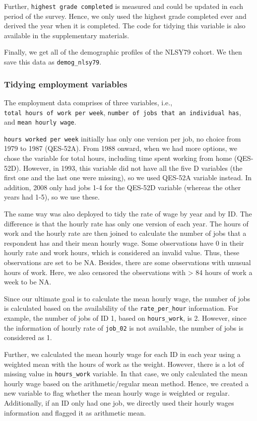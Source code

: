 \documentclass[12pt]{article}
\begin{document}
Further, \texttt{highest\ grade\ completed} is measured and could be updated in each period of the survey. Hence, we only used the highest grade completed ever and derived the year when it is completed. The code for tidying this variable is also available in the supplementary materials.

Finally, we get all of the demographic profiles of the NLSY79 cohort. We then save this data as \texttt{demog\_nlsy79}.

\hypertarget{tidyemp}{%
\subsubsection{Tidying employment variables}\label{tidyemp}}

The employment data comprises of three variables, i.e., \texttt{total\ hours\ of\ work\ per\ week}, \texttt{number\ of\ jobs\ that\ an\ individual\ has}, and \texttt{mean\ hourly\ wage}.

\texttt{hours\ worked\ per\ week} initially has only one version per job, no choice from 1979 to 1987 (QES-52A). From 1988 onward, when we had more options, we chose the variable for total hours, including time spent working from home (QES-52D). However, in 1993, this variable did not have all the five D variables (the first one and the last one were missing), so we used QES-52A variable instead. In addition, 2008 only had jobs 1-4 for the QES-52D variable (whereas the other years had 1-5), so we use these.

The same way was also deployed to tidy the rate of wage by year and by ID. The difference is that the hourly rate has only one version of each year. The hours of work and the hourly rate are then joined to calculate the number of jobs that a respondent has and their mean hourly wage. Some observations have 0 in their hourly rate and work hours, which is considered an invalid value. Thus, these observations are set to be NA. Besides, there are some observations with unusual hours of work. Here, we also censored the observations with \textgreater{} 84 hours of work a week to be NA.

Since our ultimate goal is to calculate the mean hourly wage, the number of jobs is calculated based on the availability of the \texttt{rate\_per\_hour} information. For example, the number of jobs of ID 1, based on \texttt{hours\_work}, is 2. However, since the information of hourly rate of \texttt{job\_02} is not available, the number of jobs is considered as 1.

Further, we calculated the mean hourly wage for each ID in each year using a weighted mean with the hours of work as the weight. However, there is a lot of missing value in \texttt{hours\_work} variable. In that case, we only calculated the mean hourly wage based on the arithmetic/regular mean method. Hence, we created a new variable to flag whether the mean hourly wage is weighted or regular. Additionally, if an ID only had one job, we directly used their hourly wages information and flagged it as arithmetic mean.
\end{document}
